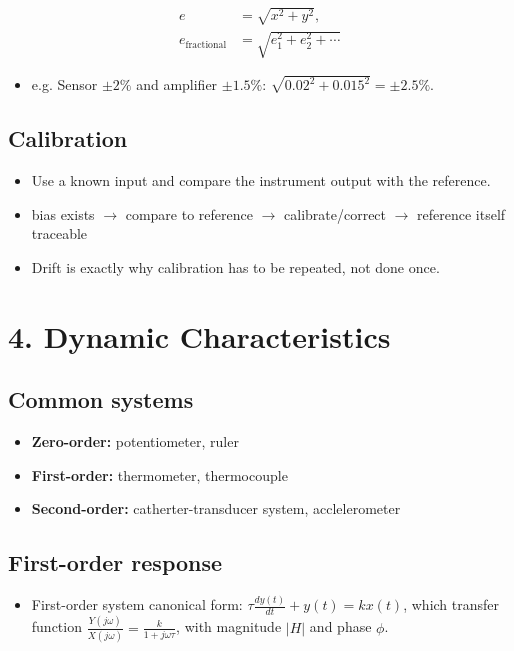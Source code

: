 \documentclass[10pt,a4paper]{ctexart}
\newcommand{\key}[1]{\textbf{#1}}
\newcommand{\formula}[1]{%
  \par\vspace{1pt}%
  \begingroup
  \setlength{\abovedisplayskip}{0pt}%
  \setlength{\belowdisplayskip}{0pt}%
  \[
    #1
  \]
  \endgroup
  \vspace{1pt}%
}
\begin{document}
\begin{multicols*}{3}
\formula{\displaystyle
  \begin{aligned}
    e&=\sqrt{x^2+y^2},\\
    e_\mathrm{fractional}&=\sqrt{e_1^2+e_2^2+\cdots}
  \end{aligned}}

\begin{itemize}
  \item e.g. Sensor $\pm2\%$ and amplifier $\pm1.5\%$:
  $\sqrt{0.02^2+0.015^2}=\pm2.5\%$.
\end{itemize}

\subsection{Calibration}
\begin{itemize}
  \item Use a known input and compare the instrument output with the reference.
  \item bias exists $\rightarrow$ compare to reference 
  $\rightarrow$ calibrate/correct $\rightarrow$ reference itself traceable
  \item Drift is exactly why calibration has to be repeated, not done once.
\end{itemize}


\section{4. Dynamic Characteristics}
\subsection{Common systems}
\begin{itemize}
  \item \key{Zero-order:} potentiometer, ruler
  \item \key{First-order:} thermometer, thermocouple
  \item \key{Second-order:} catherter-transducer system, acclelerometer
\end{itemize}

\subsection{First-order response}
\begin{itemize}
    \item First-order system canonical form: $\tau\frac{dy(t)}{dt}+y(t)=kx(t)$, 
    which  transfer function $\frac{Y(j\omega)}{X(j\omega)}=\frac{k}{1+j\omega\tau}$, 
    with magnitude $|H|$ and phase $\phi$.
\end{itemize}


\end{multicols*}
\end{document}
